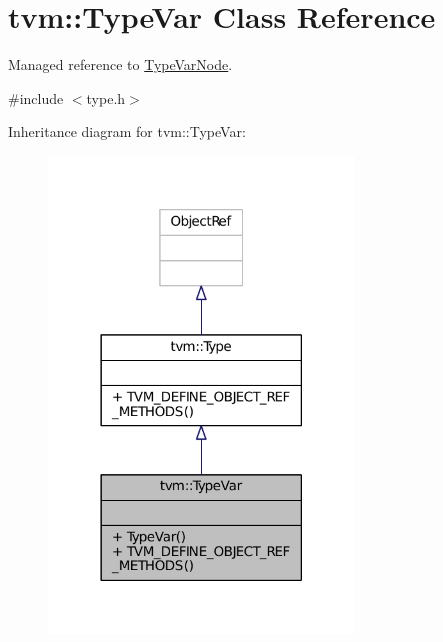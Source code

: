 \hypertarget{classtvm_1_1TypeVar}{}\section{tvm\+:\+:Type\+Var Class Reference}
\label{classtvm_1_1TypeVar}


Managed reference to \hyperlink{classtvm_1_1TypeVarNode}{Type\+Var\+Node}.  




{\ttfamily \#include $<$type.\+h$>$}



Inheritance diagram for tvm\+:\+:Type\+Var\+:
\nopagebreak
\begin{figure}[H]
\begin{center}
\leavevmode
\includegraphics[width=230pt]{classtvm_1_1TypeVar__inherit__graph}
\end{center}
\end{figure}


